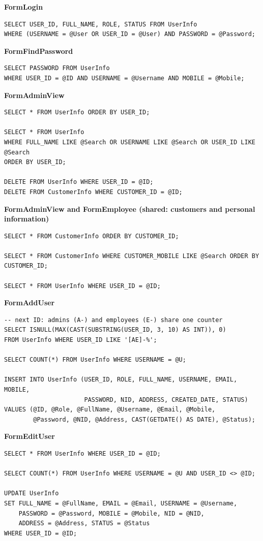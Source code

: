 \documentclass[12pt,a4paper]{article}
\begin{document}
\textbf{FormLogin}
\begin{lstlisting}
SELECT USER_ID, FULL_NAME, ROLE, STATUS FROM UserInfo
WHERE (USERNAME = @User OR USER_ID = @User) AND PASSWORD = @Password;
\end{lstlisting}

\textbf{FormFindPassword}
\begin{lstlisting}
SELECT PASSWORD FROM UserInfo
WHERE USER_ID = @ID AND USERNAME = @Username AND MOBILE = @Mobile;
\end{lstlisting}

\textbf{FormAdminView}
\begin{lstlisting}
SELECT * FROM UserInfo ORDER BY USER_ID;

SELECT * FROM UserInfo
WHERE FULL_NAME LIKE @Search OR USERNAME LIKE @Search OR USER_ID LIKE @Search
ORDER BY USER_ID;

DELETE FROM UserInfo WHERE USER_ID = @ID;
DELETE FROM CustomerInfo WHERE CUSTOMER_ID = @ID;
\end{lstlisting}

\textbf{FormAdminView and FormEmployee (shared: customers and personal information)}
\begin{lstlisting}
SELECT * FROM CustomerInfo ORDER BY CUSTOMER_ID;

SELECT * FROM CustomerInfo WHERE CUSTOMER_MOBILE LIKE @Search ORDER BY CUSTOMER_ID;

SELECT * FROM UserInfo WHERE USER_ID = @ID;
\end{lstlisting}

\textbf{FormAddUser}
\begin{lstlisting}
-- next ID: admins (A-) and employees (E-) share one counter
SELECT ISNULL(MAX(CAST(SUBSTRING(USER_ID, 3, 10) AS INT)), 0)
FROM UserInfo WHERE USER_ID LIKE '[AE]-%';

SELECT COUNT(*) FROM UserInfo WHERE USERNAME = @U;

INSERT INTO UserInfo (USER_ID, ROLE, FULL_NAME, USERNAME, EMAIL, MOBILE,
                      PASSWORD, NID, ADDRESS, CREATED_DATE, STATUS)
VALUES (@ID, @Role, @FullName, @Username, @Email, @Mobile,
        @Password, @NID, @Address, CAST(GETDATE() AS DATE), @Status);
\end{lstlisting}

\textbf{FormEditUser}
\begin{lstlisting}
SELECT * FROM UserInfo WHERE USER_ID = @ID;

SELECT COUNT(*) FROM UserInfo WHERE USERNAME = @U AND USER_ID <> @ID;

UPDATE UserInfo
SET FULL_NAME = @FullName, EMAIL = @Email, USERNAME = @Username,
    PASSWORD = @Password, MOBILE = @Mobile, NID = @NID,
    ADDRESS = @Address, STATUS = @Status
WHERE USER_ID = @ID;
\end{lstlisting}
\end{document}
